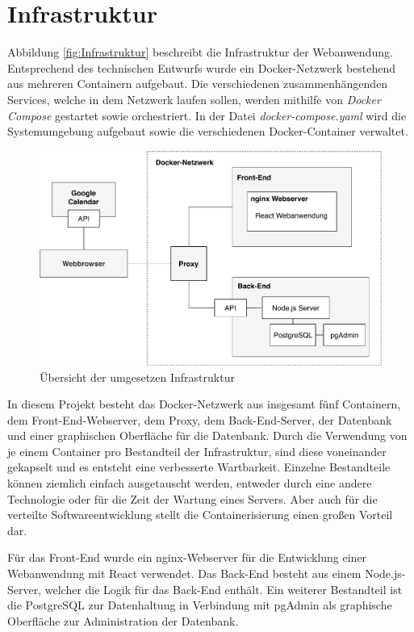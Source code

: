 \section{Infrastruktur}
\label{ch:Infrastruktur}
Abbildung \vref{fig:Infrastruktur} beschreibt die Infrastruktur der Webanwendung. Entsprechend des technischen Entwurfs wurde ein Docker-Netzwerk bestehend aus mehreren Containern aufgebaut.
Die verschiedenen zusammenhängenden Services, welche in dem Netzwerk laufen sollen, werden mithilfe von \textit{Docker Compose} gestartet sowie orchestriert.  
In der Datei \textit{docker-compose.yaml} wird die Systemumgebung aufgebaut sowie die verschiedenen Docker-Container verwaltet.

\begin{figure}[h]
	\centering 
	\includegraphics[width=\textwidth]{img/ImplementierungInfrastruktur.pdf}
	\caption[Übersicht der umgesetzen Infrastruktur]{\label{fig:Infrastruktur}Übersicht der umgesetzen Infrastruktur}
\end{figure}

In diesem Projekt besteht das Docker-Netzwerk aus insgesamt fünf Containern, dem Front-End-Webserver, dem Proxy, dem Back-End-Server, der Datenbank und einer graphischen Oberfläche für die Datenbank.
Durch die Verwendung von je einem Container pro Bestandteil der Infrastruktur, sind diese voneinander gekapselt und es entsteht eine verbesserte Wartbarkeit.
Einzelne Bestandteile können ziemlich einfach ausgetauscht werden, entweder durch eine andere Technologie oder für die Zeit der Wartung eines Servers.
Aber auch für die verteilte Softwareentwicklung stellt die Containerisierung einen großen Vorteil dar. 

Für das Front-End wurde ein nginx-Webserver für die Entwicklung einer Webanwendung mit React verwendet.
Das Back-End besteht aus einem Node.js-Server, welcher die Logik für das Back-End enthält.
Ein weiterer Bestandteil ist die PostgreSQL zur Datenhaltung in Verbindung mit pgAdmin als graphische Oberfläche zur Administration der Datenbank. 

